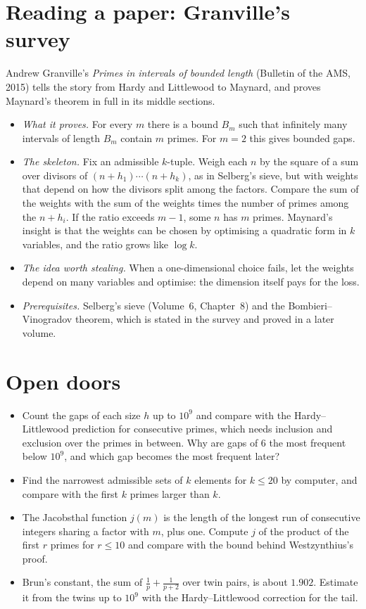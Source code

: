 \section{Reading a paper: Granville's survey}

Andrew Granville's \emph{Primes in intervals of bounded length} (Bulletin of the AMS, 2015) tells the story from Hardy and Littlewood to Maynard, and
proves Maynard's theorem in full in its middle sections.
\begin{itemize}
\item \emph{What it proves.} For every $m$ there is a bound $B_m$ such that infinitely many intervals of length $B_m$ contain $m$ primes. For $m=2$ this
gives bounded gaps.
\item \emph{The skeleton.} Fix an admissible $k$-tuple. Weigh each $n$ by the square of a sum over divisors of $(n+h_1)\cdots(n+h_k)$, as in Selberg's sieve,
but with weights that depend on how the divisors split among the factors. Compare the sum of the weights with the sum of the weights times the number
of primes among the $n+h_i$. If the ratio exceeds $m-1$, some $n$ has $m$ primes. Maynard's insight is that the weights can be chosen by optimising a
quadratic form in $k$ variables, and the ratio grows like $\log k$.
\item \emph{The idea worth stealing.} When a one-dimensional choice fails, let the weights depend on many variables and optimise: the dimension itself
pays for the loss.
\item \emph{Prerequisites.} Selberg's sieve (Volume~6, Chapter~8) and the Bombieri--\allowbreak Vinogradov theorem, which is stated in the survey and proved in a
later volume.
\end{itemize}

\section{Open doors}

\begin{itemize}
\item Count the gaps of each size $h$ up to $10^9$ and compare with the Hardy--Littlewood prediction for consecutive primes, which needs inclusion and
exclusion over the primes in between. Why are gaps of $6$ the most frequent below $10^{9}$, and which gap becomes the most frequent later?
\item Find the narrowest admissible sets of $k$ elements for $k\le20$ by computer, and compare with the first $k$ primes larger than $k$.
\item The Jacobsthal function $j(m)$ is the length of the longest run of consecutive integers sharing a factor with $m$, plus one. Compute $j$ of the
product of the first $r$ primes for $r\le10$ and compare with the bound behind Westzynthius's proof.
\item Brun's constant, the sum of $\frac1p+\frac1{p+2}$ over twin pairs, is about $1.902$. Estimate it from the twins up to $10^9$ with the
Hardy--Littlewood correction for the tail.
\end{itemize}

